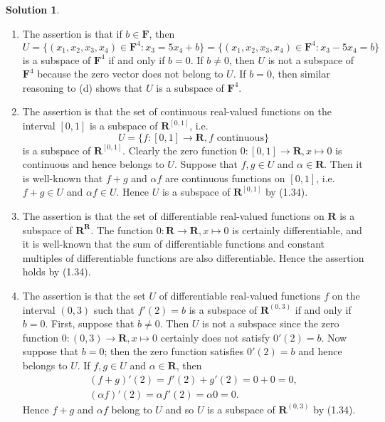 \documentclass[12pt]{article}
\theoremstyle{definition}
\theoremstyle{exercise}
\theoremstyle{solution}
\newtheorem*{solution}{Solution}
\newcommand{\R}{\mathbf{R}}
\newcommand{\F}{\mathbf{F}}
\begin{document}
\begin{solution}
    \begin{enumerate}
        \item The assertion is that if \( b \in \F \), then
        \[
            U = \{ (x_1, x_2, x_3, x_4) \in \F^4 : x_3 = 5 x_4 + b \} = \{ (x_1, x_2, x_3, x_4) \in \F^4 : x_3 - 5 x_4 = b \}
        \]
        is a subspace of \( \F^4 \) if and only if \( b = 0 \). If \( b \neq 0 \), then \( U \) is not a subspace of \( \F^4 \) because the zero vector does not belong to \( U \). If \( b = 0 \), then similar reasoning to  (d) shows that \( U \) is a subspace of \( \F^4 \).

        \item The assertion is that the set of continuous real-valued functions on the interval \( [0, 1] \) is a subspace of \( \R^{[0, 1]} \), i.e.\
        \[
            U = \{ f : [0, 1] \to \R, f \text{ continuous} \}
        \]
        is a subspace of \( \R^{[0, 1]} \). Clearly the zero function \( 0 : [0, 1] \to \R, x \mapsto 0 \) is continuous and hence belongs to \( U \). Suppose that \( f, g \in U \) and \( \alpha \in \R \). Then it is well-known that \( f + g \) and \( \alpha f \) are continuous functions on \( [0, 1] \), i.e.\ \( f + g \in U \) and \( \alpha f \in U \). Hence \( U \) is a subspace of \( \R^{[0, 1]} \) by (1.34).

        \item The assertion is that the set of differentiable real-valued functions on \( \R \) is a subspace of \( \R^{\R} \). The function \( 0 : \R \to \R, x \mapsto 0 \) is certainly differentiable, and it is well-known that the sum of differentiable functions and constant multiples of differentiable functions are also differentiable. Hence the assertion holds by (1.34).

        \item The assertion is that the set \( U \) of differentiable real-valued functions \( f \) on the interval \( (0, 3) \) such that \( f'(2) = b \) is a subspace of \( \R^{(0, 3)} \) if and only if \( b = 0 \). First, suppose that \( b \neq 0 \). Then \( U \) is not a subspace since the zero function \( 0 : (0, 3) \to \R, x \mapsto 0 \) certainly does not satisfy \( 0'(2) = b \). Now suppose that \( b = 0 \); then the zero function satisfies \( 0'(2) = b \) and hence belongs to \( U \). If \( f, g \in U \) and \( \alpha \in \R \), then
        \begin{gather*}
            (f + g)'(2) = f'(2) + g'(2) = 0 + 0 = 0, \\[2mm]
            (\alpha f)'(2) = \alpha f'(2) = \alpha 0 = 0.
        \end{gather*}
        Hence \( f + g \) and \( \alpha f \) belong to \( U \) and so \( U \) is a subspace of \( \R^{(0, 3)} \) by (1.34).


\end{enumerate}
\end{solution}
\end{document}
